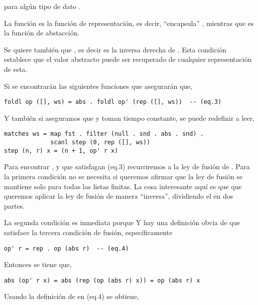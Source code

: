 para algún tipo de dato .

La función  es la función de representación, es decir, ``encapsula'' \hsCode{([a], [a])}, mientras que  es la función de abstacción.

Se quiere también que , es decir  es la inversa derecha de . Esta condición establece que el valor abstracto puede ser recuperado de cualquier representación de esta.

Si se encontrarán las siguientes funciones que asegurarán que,
\begin{verbatim}
foldl op ([], ws) = abs . foldl op' (rep ([], ws))  -- (eq.3)
\end{verbatim}

Y también si aseguramos que  y  toman tiempo constante, se puede redefinir  a leer,

\begin{verbatim}
matches ws = map fst . filter (null . snd . abs . snd) .
             scanl step (0, rep ([], ws))
step (n, r) x = (n + 1, op' r x)    
\end{verbatim}

Para encontrar ,  y  que satisfagan (eq.3) recurriremos a la ley de fusión de .
Para la primera condición no se necesita si queremos afirmar que la ley de fusión se mantiene solo para todas las listas finitas.
La cosa interesante aquí es que que queremos aplicar la ley de fusión de manera ``inversa'', dividiendo el  en dos partes.

La segunda condición es inmediata porque  %
Y hay una definición obvia de  que satisface la tercera condición de fusión, específicamente
\begin{verbatim}
op' r = rep . op (abs r)  -- (eq.4)
\end{verbatim}

Entonces se tiene que,
\begin{verbatim}
abs (op' r x) = abs (rep (op (abs r) x)) = op (abs r) x
\end{verbatim}

Usando la definición de  en (eq.4) se obtiene,

